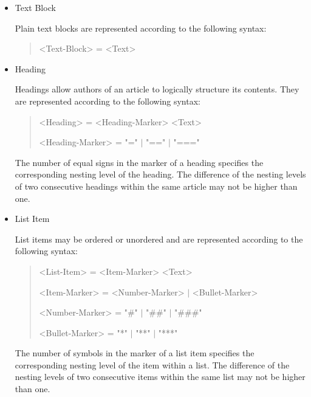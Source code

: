 \begin{itemize}

\item Text Block\nopagebreak

Plain text blocks are represented according to the following syntax:

\begin{quote}\begin{grammar}
<Text-Block> = <Text> \par
\end{grammar}\end{quote}

\item Heading\nopagebreak

Headings allow authors of an article to logically structure its contents.
They are represented according to the following syntax:

\begin{quote}\begin{grammar}
<Heading> = <Heading-Marker> <Text> \par
<Heading-Marker> = "=" $\mid$ "==" $\mid$ "===" \par
\end{grammar}\end{quote}

The number of equal signs in the marker of a heading specifies the corresponding nesting level of the heading.
The difference of the nesting levels of two consecutive headings within the same article may not be higher than one.

\item List Item\nopagebreak

List items may be ordered or unordered and are represented according to the following syntax:

\begin{quote}\begin{grammar}
<List-Item> = <Item-Marker> <Text> \par
<Item-Marker> = <Number-Marker> $\mid$ <Bullet-Marker> \par
<Number-Marker> = "#" $\mid$ "##" $\mid$ "###" \par
<Bullet-Marker> = "*" $\mid$ "**" $\mid$ "***" \par
\end{grammar}\end{quote}

The number of symbols in the marker of a list item specifies the corresponding nesting level of the item within a list.
The difference of the nesting levels of two consecutive items within the same list may not be higher than one.


\end{itemize}

